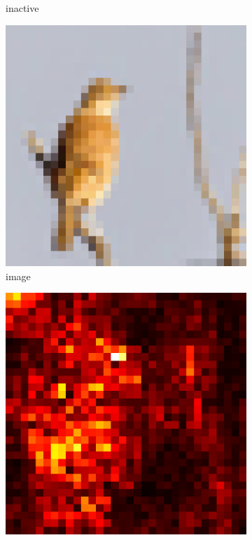 \documentclass[preprint,12pt]{elsarticle}
\begin{document}
\begin{figure}
\begin{subfigure}{0.14\textwidth}
        \caption{inactive}
    \end{subfigure}
    \begin{subfigure}{0.14\linewidth}
        \centering
        \includegraphics[width=\linewidth]{../visualizations/examples/cifar10/cnn/images/2.png}
        \caption{image}
    \end{subfigure}
    \hfill
    \begin{subfigure}{0.14\linewidth}
        \centering
        \includegraphics[width=\linewidth]{../visualizations/examples/cifar10/cnn/saliency_map/2.png}

\end{subfigure}
\end{figure}
\end{document}
